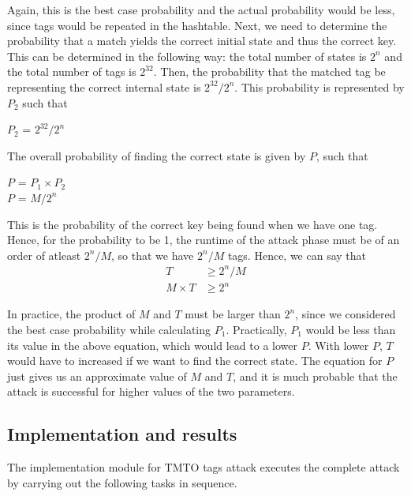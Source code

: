 Again, this is the best case probability and the actual probability would be less, since tags would be repeated in the hashtable. Next, we need to determine the probability that a match yields the correct initial state and thus the correct key. This can be determined in the following way: the total number of states is $2^n$ and the total number of tags is $2^{32}$. Then, the probability that the matched tag be representing the correct internal state is $2^{32}/2^n$. This probability is represented by $P_2$ such that

\begin{center}
$P_2$ = $2^{32}/2^n$
\end{center}

The overall probability of finding the correct state is given by $P$, such that

\begin{center}
$P$ = $P_1 \times P_2$\\
$P$ = $M/2^{n}$\\
\end{center}

This is the probability of the correct key being found when we have one tag. Hence, for the probability to be 1, the runtime of the attack phase must be of an order of atleast $2^{n}/M$, so that we have $2^{n}/M$ tags. Hence, we can say that
\begin{align*}
T &\geq 2^{n}/M\\
M \times T &\geq 2^{n}
\end{align*}

In practice, the product of $M$ and $T$ must be larger than $2^n$, since we considered the best case probability while calculating $P_1$. Practically, $P_1$ would be less than its value in the above equation, which would lead to a lower $P$. With lower $P$, $T$ would have to increased if we want to find the correct state. The equation for $P$ just gives us an approximate value of $M$ and $T$, and it is much probable that the attack is successful for higher values of the two parameters.

\subsection{Implementation and results}

The implementation module for TMTO tags attack executes the complete attack by carrying out the following tasks in sequence. 

